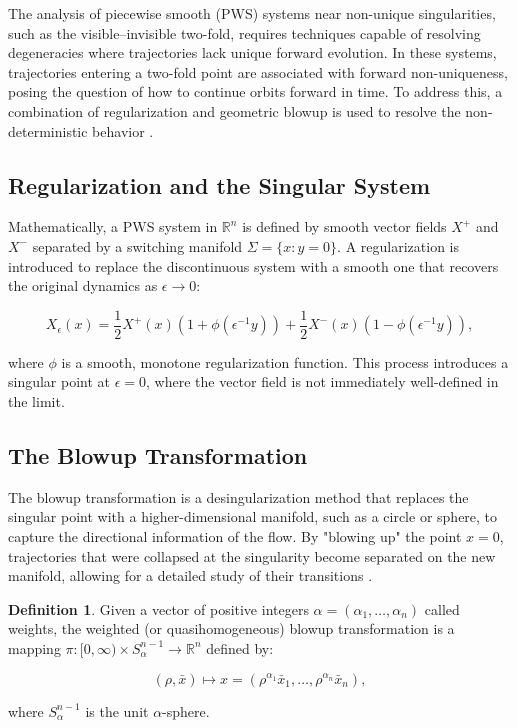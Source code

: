 \documentclass[12pt, a4paper, oneside]{book}
\theoremstyle{plain}
\theoremstyle{definition}
\newtheorem{definition}[theorem]{Definition}
\theoremstyle{remark}
\theoremstyle{definition}
\begin{document}
The analysis of piecewise smooth (PWS) systems near non-unique singularities, such as the visible–invisible two-fold, requires techniques capable of resolving degeneracies where trajectories lack unique forward evolution. In these systems, trajectories entering a two-fold point are associated with forward non-uniqueness, posing the question of how to continue orbits forward in time. To address this, a combination of regularization and geometric blowup is used to resolve the non-deterministic behavior \cite{kristiansen2019resolution}.

\subsection{Regularization and the Singular System}

Mathematically, a PWS system in $\mathbb{R}^n$ is defined by smooth vector fields $X^+$ and $X^-$ separated by a switching manifold $\Sigma = \{x : y = 0\}$. A regularization is introduced to replace the discontinuous system with a smooth one that recovers the original dynamics as $\epsilon \to 0$:

\begin{equation}
    X_\epsilon(x) = \frac{1}{2}X^+(x)(1 + \phi(\epsilon^{-1}y)) + \frac{1}{2}X^-(x)(1 - \phi(\epsilon^{-1}y)),
\end{equation}

where $\phi$ is a smooth, monotone regularization function. This process introduces a singular point at $\epsilon = 0$, where the vector field is not immediately well-defined in the limit.

\subsection{The Blowup Transformation}

The blowup transformation is a desingularization method that replaces the singular point with a higher-dimensional manifold, such as a circle or sphere, to capture the directional information of the flow. By "blowing up" the point $x=0$, trajectories that were collapsed at the singularity become separated on the new manifold, allowing for a detailed study of their transitions \cite{kristiansen2019resolution}.

\begin{definition}
Given a vector of positive integers $\alpha = (\alpha_1, \dots, \alpha_n)$ called weights, the weighted (or quasihomogeneous) blowup transformation is a mapping $\pi: [0, \infty) \times S^{n-1}_{\alpha} \to \mathbb{R}^n$ defined by:

\begin{equation}
    (\rho, \bar{x}) \mapsto x = (\rho^{\alpha_1} \bar{x}_1, \dots, \rho^{\alpha_n} \bar{x}_n),
\end{equation}

where $S^{n-1}_{\alpha}$ is the unit $\alpha$-sphere.
\end{definition}
\end{document}
